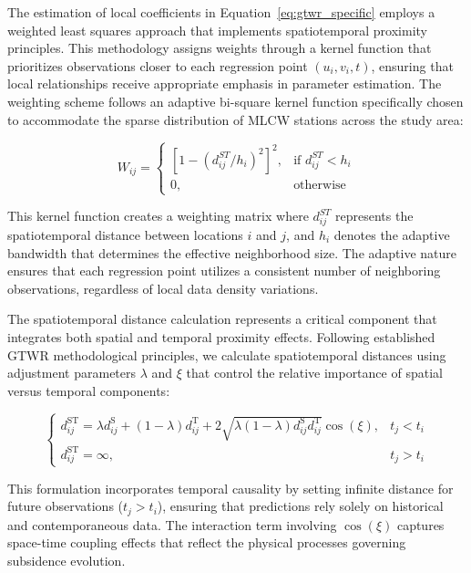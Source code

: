 \documentclass[12pt, a4paper]{article}
\begin{document}
	The estimation of local coefficients in Equation~\ref{eq:gtwr_specific} employs a weighted least squares approach that implements spatiotemporal proximity principles. This methodology assigns weights through a kernel function that prioritizes observations closer to each regression point $(u_i, v_i, t)$, ensuring that local relationships receive appropriate emphasis in parameter estimation. The weighting scheme follows an adaptive bi-square kernel function specifically chosen to accommodate the sparse distribution of MLCW stations across the study area:
	
	\begin{equation}
		W_{ij} = \begin{cases} 
			[1 - (d^{ST}_{ij}/h_i)^2]^2, & \text{if } d^{ST}_{ij} < h_i \\
			0, & \text{otherwise}
		\end{cases}
	\end{equation}
	
	This kernel function creates a weighting matrix where $d^{ST}_{ij}$ represents the spatiotemporal distance between locations $i$ and $j$, and $h_i$ denotes the adaptive bandwidth that determines the effective neighborhood size. The adaptive nature ensures that each regression point utilizes a consistent number of neighboring observations, regardless of local data density variations.
	
	The spatiotemporal distance calculation represents a critical component that integrates both spatial and temporal proximity effects. Following established GTWR methodological principles, we calculate spatiotemporal distances using adjustment parameters $\lambda$ and $\xi$ that control the relative importance of spatial versus temporal components:
	
	\begin{equation}
		\begin{cases}
			d_{ij}^{\text{ST}} = \lambda d_{ij}^{\text{S}} + (1-\lambda) d_{ij}^{\text{T}} + 2 \sqrt{\lambda (1-\lambda) d_{ij}^{\text{S}} d_{ij}^{\text{T}}} \cos(\xi), & t_j < t_i \\
			d_{ij}^{\text{ST}} = \infty, & t_j > t_i
		\end{cases}
	\end{equation}
	
	This formulation incorporates temporal causality by setting infinite distance for future observations ($t_j > t_i$), ensuring that predictions rely solely on historical and contemporaneous data. The interaction term involving $\cos(\xi)$ captures space-time coupling effects that reflect the physical processes governing subsidence evolution.
	
\end{document}
